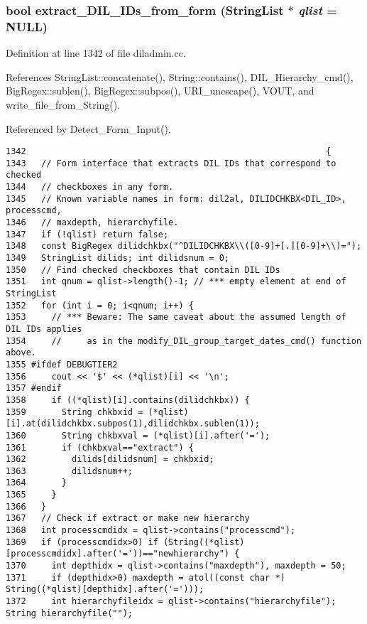 \subsubsection{\setlength{\rightskip}{0pt plus 5cm}bool extract\_\-DIL\_\-IDs\_\-from\_\-form ({\bf String\-List} $\ast$ {\em qlist} = NULL)}\label{diladmin_8cc_a19}




Definition at line 1342 of file diladmin.cc.

References String\-List::concatenate(), String::contains(), DIL\_\-Hierarchy\_\-cmd(), Big\-Regex::sublen(), Big\-Regex::subpos(), URI\_\-unescape(), VOUT, and write\_\-file\_\-from\_\-String().

Referenced by Detect\_\-Form\_\-Input().



\footnotesize\begin{verbatim}1342                                                           {
1343   // Form interface that extracts DIL IDs that correspond to checked
1344   // checkboxes in any form.
1345   // Known variable names in form: dil2al, DILIDCHKBX<DIL_ID>, processcmd,
1346   // maxdepth, hierarchyfile.
1347   if (!qlist) return false;
1348   const BigRegex dilidchkbx("^DILIDCHKBX\\([0-9]+[.][0-9]+\\)=");
1349   StringList dilids; int dilidsnum = 0;
1350   // Find checked checkboxes that contain DIL IDs
1351   int qnum = qlist->length()-1; // *** empty element at end of StringList
1352   for (int i = 0; i<qnum; i++) {
1353     // *** Beware: The same caveat about the assumed length of DIL IDs applies
1354     //     as in the modify_DIL_group_target_dates_cmd() function above.
1355 #ifdef DEBUGTIER2
1356     cout << '$' << (*qlist)[i] << '\n';
1357 #endif
1358     if ((*qlist)[i].contains(dilidchkbx)) {
1359       String chkbxid = (*qlist)[i].at(dilidchkbx.subpos(1),dilidchkbx.sublen(1));
1360       String chkbxval = (*qlist)[i].after('=');
1361       if (chkbxval=="extract") {
1362         dilids[dilidsnum] = chkbxid;
1363         dilidsnum++;
1364       }
1365     }
1366   }
1367   // Check if extract or make new hierarchy
1368   int processcmdidx = qlist->contains("processcmd");
1369   if (processcmdidx>0) if (String((*qlist)[processcmdidx].after('='))=="newhierarchy") {
1370     int depthidx = qlist->contains("maxdepth"), maxdepth = 50;
1371     if (depthidx>0) maxdepth = atol((const char *) String((*qlist)[depthidx].after('=')));
1372     int hierarchyfileidx = qlist->contains("hierarchyfile"); String hierarchyfile("");

\end{verbatim}
